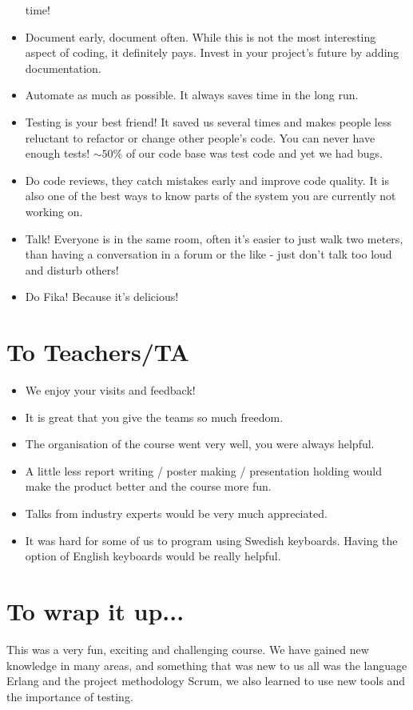 \documentclass[11pt,a4paper]{report}
\begin{document}
\begin{itemize}
  time!
\item Document early, document often. While this is not the most interesting
  aspect of coding, it definitely pays. Invest in your project's future by
  adding documentation.
\item Automate as much as possible. It always saves time in the long run.
\item Testing is your best friend!
      It saved us several times and makes people less reluctant to refactor
      or change other people's code.
      You can never have enough tests!
      $\sim 50\%$ of our code base was test code and yet we had bugs.
\item Do code reviews, they catch mistakes early and improve code quality.
      It is also one of the best ways to know parts of the system you are
      currently not working on.
\item Talk! Everyone is in the same room, often it's easier to just walk two
      meters, than having a conversation in a forum or the like -
      just don't talk too loud and disturb others!
\item Do Fika! Because it's delicious!
\end{itemize}
\section*{To Teachers/TA}
\begin{itemize}
\item We enjoy your visits and feedback!
\item It is great that you give the teams so much freedom.
\item The organisation of the course went very well, you were always helpful.
\item A little less report writing / poster making / presentation holding would
  make the product better and the course more fun.
\item Talks from industry experts would be very much appreciated.
\item It was hard for some of us to program using Swedish keyboards. Having
the option of English keyboards would be really helpful.
\end{itemize}


\section*{To wrap it up...}
This was a very fun, exciting and challenging course. We have gained new
knowledge in many areas, and something that was new to us all was the
language Erlang and the project methodology Scrum, we also learned to
use new tools and the importance of testing.
\end{document}
